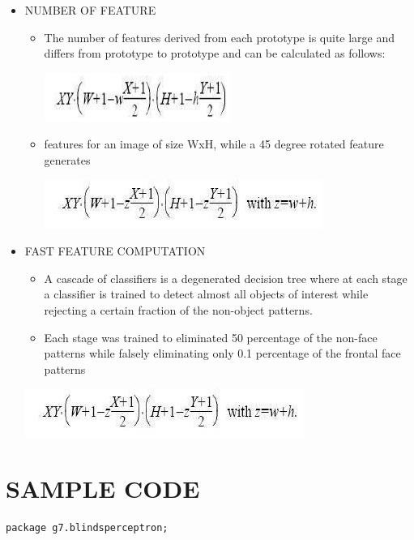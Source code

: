 \documentclass[10pt,a4paper,twoside]{report}
\begin{document}
\begin{appendix}
\begin{enumerate}
\begin{itemize}
\begin{itemize}
\end{itemize}
\newpage
\item NUMBER OF FEATURE
\begin{itemize}
\item The number of features derived from each prototype is quite large and differs from prototype to prototype and can be calculated as follows:\\
\begin{center}
\includegraphics[scale=1]{kira3}
\end{center}
\item features for an image of size WxH, while a 45 degree rotated feature generates
\begin{center}
\includegraphics[scale=1]{kira4}
\end{center}
\end{itemize}
\item FAST FEATURE COMPUTATION
\begin{itemize}
\item A cascade of classifiers is a degenerated decision tree where at each stage a classifier is trained to detect almost all objects of interest while rejecting a certain fraction of the non-object patterns.
\item Each stage was trained to eliminated 50 percentage of the non-face patterns while falsely eliminating only 0.1 percentage of the frontal face patterns
\end{itemize}
\begin{center}
\includegraphics[scale=1]{kira4}
\end{center}

\end{itemize}

\end{enumerate}

\section{SAMPLE CODE}
\begin{tiny}
\begin{flushleft}
\begin{lstlisting}
package g7.blindsperceptron;


\end{lstlisting}
\end{flushleft}
\end{tiny}
\end{appendix}
\end{document}
